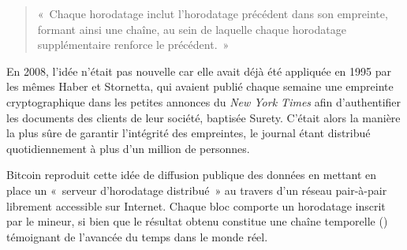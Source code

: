 \begin{quote}
«~Chaque horodatage inclut l'horodatage précédent dans son empreinte, formant ainsi une chaîne, au sein de laquelle chaque horodatage supplémentaire renforce le précédent.~»
\end{quote}

En 2008, l'idée n'était pas nouvelle car elle avait déjà été appliquée en 1995 par les mêmes Haber et Stornetta, qui avaient publié chaque semaine une empreinte cryptographique dans les petites annonces du \emph{New York Times} afin d'authentifier les documents des clients de leur société, baptisée Surety. C'était alors la manière la plus sûre de garantir l'intégrité des empreintes, le journal étant distribué quotidiennement à plus d'un million de personnes.


Bitcoin reproduit cette idée de diffusion publique des données en mettant en place un «~serveur d'horodatage distribué~» au travers d'un réseau pair-à-pair librement accessible sur Internet. Chaque bloc comporte un horodatage inscrit par le mineur, si bien que le résultat obtenu constitue une chaîne temporelle () témoignant de l'avancée du temps dans le monde réel.

